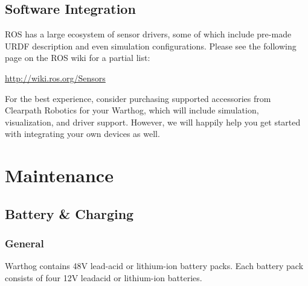 \documentclass[]{clearpath-latex/clearpath-manual}
\begin{document}
\pagebreak

\subsection{Software Integration}

ROS has a large ecosystem of sensor drivers, some of which include pre-made URDF description and even simulation configurations.  Please see the following page on the ROS wiki for a partial list:

\url{http://wiki.ros.org/Sensors}

For the best experience, consider purchasing supported accessories from Clearpath Robotics for your Warthog, which will include simulation, visualization, and driver support.  However, we will happily help you get started with integrating your own devices as well.

\section{Maintenance}

\subsection{Battery \& Charging}

\subsubsection{General}

Warthog contains 48V lead-acid or lithium-ion battery packs. Each battery pack consists of four 12V leadacid or lithium-ion batteries.
\end{document}
